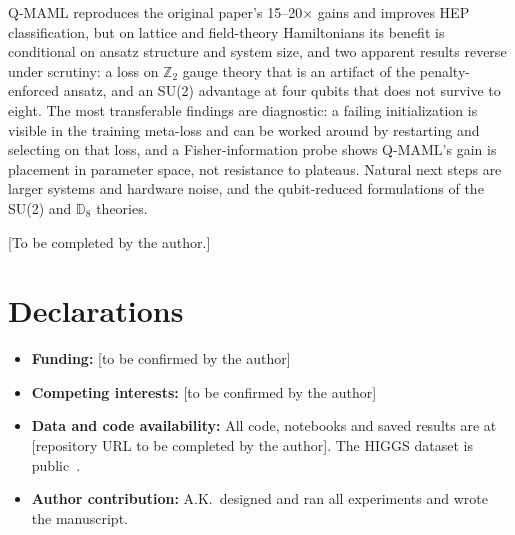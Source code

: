 Q-MAML reproduces the original paper's 15--20$\times$ gains and improves HEP classification, but on lattice and field-theory Hamiltonians its benefit is conditional on ansatz structure and system size, and two apparent results reverse under scrutiny: a loss on $\mathbb{Z}_2$ gauge theory that is an artifact of the penalty-enforced ansatz, and an SU(2) advantage at four qubits that does not survive to eight. The most transferable findings are diagnostic: a failing initialization is visible in the training meta-loss and can be worked around by restarting and selecting on that loss, and a Fisher-information probe shows Q-MAML's gain is placement in parameter space, not resistance to plateaus. Natural next steps are larger systems and hardware noise, and the qubit-reduced formulations of the SU(2) and $\mathbb{D}_8$ theories.

\FloatBarrier
\backmatter

[To be completed by the author.]

\section*{Declarations}
\begin{itemize}
\item \textbf{Funding:} [to be confirmed by the author]
\item \textbf{Competing interests:} [to be confirmed by the author]
\item \textbf{Data and code availability:} All code, notebooks and saved results are at [repository URL to be completed by the author]. The HIGGS dataset is public~\cite{baldi2014higgs}.
\item \textbf{Author contribution:} A.K.\ designed and ran all experiments and wrote the manuscript.
\end{itemize}

